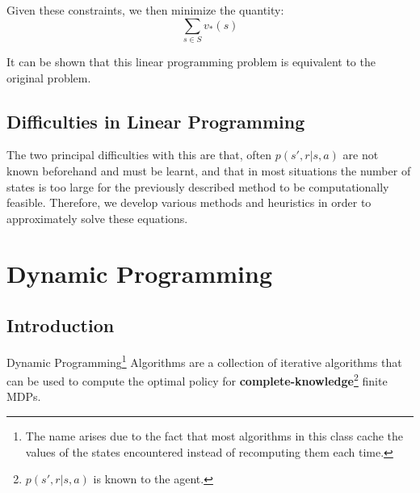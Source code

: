 \documentclass[12pt]{report}
\begin{document}
Given these constraints, we then minimize the quantity:
\begin{equation}
    \sum\limits_{s \in S} v_{*}(s)
\end{equation}

It can be shown that this linear programming problem is equivalent to the original problem. 


\section{Difficulties in Linear Programming}
The two principal difficulties with this are that, often $p(s', r | s, a)$ are not known beforehand and must be learnt, and that in most situations the number of states is too large for the previously described method to be computationally feasible. Therefore, we develop various methods and 
heuristics in order to approximately solve these equations.

\chapter{Dynamic Programming}
\section{Introduction}
Dynamic Programming\footnote{The name arises due to the fact that most algorithms in this class cache the values of the states encountered instead of recomputing them each time.} Algorithms are a collection of iterative algorithms that can be used to compute the optimal policy for \textbf{complete-knowledge}\footnote{$p(s', r | s, a)$ is known to the agent.} finite MDPs. 
\end{document}
